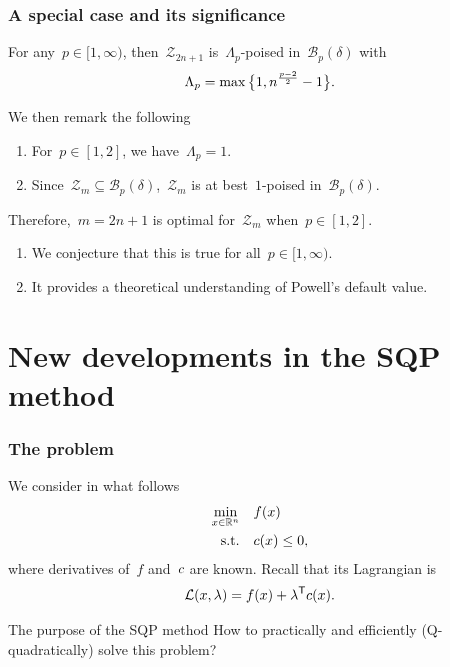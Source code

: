 \documentclass{polyu-presentation}
\newcommand{\con}[1][]{c\ifthenelse{\equal{#1}{}}{}{_{#1}}}
\newcommand{\iter}[1][]{x\ifthenelse{\equal{#1}{}}{}{^{#1}}}
\newcommand{\lag}[1][]{\mathcal{L}\ifthenelse{\equal{#1}{}}{}{^{#1}}}
\newcommand{\lm}[1][]{\lambda\ifthenelse{\equal{#1}{}}{}{^{#1}}}
\newcommand{\obj}{f}
\begin{document}
\begin{frame}
    \frametitle{A special case and its significance}

    \begin{block}{}
        For any~$p \in [1, \infty)$, then~$\mathcal{Z}_{2n + 1}$ is~$\Lambda_p$-poised in~$\mathcal{B}_p(\delta)$ with
        \begin{equation*}
            \Lambda_p = \max \set[\big]{1, n^{\frac{p - 2}{2}} - 1}.
        \end{equation*}
    \end{block}

    \medskip

    We then remark the following
    \begin{enumerate}
        \item For~$p \in [1, 2]$, we have~$\Lambda_p = 1$.
        \item Since~$\mathcal{Z}_m \subseteq \mathcal{B}_p(\delta)$,~$\mathcal{Z}_m$ is \alert{at best}~$1$-poised in~$\mathcal{B}_p(\delta)$.
    \end{enumerate}
    
    \medskip

    \begin{block}{}
        Therefore,~$m = 2n + 1$ is \alert{optimal} for~$\mathcal{Z}_m$ when~$p \in [1, 2]$.
    \end{block}

    \medskip

    \begin{enumerate}
        \item We \alert{conjecture} that this is true for all~$p \in [1, \infty)$.
        \item It provides a theoretical \alert{understanding} of Powell's default value.
    \end{enumerate}
\end{frame}

\section{New developments in the SQP method}

\begin{frame}
    \frametitle{The problem}

	We consider in what follows
    \begin{align*}
        \min_{\iter \in \R^n}   & \quad \obj(\iter)\\
        \text{s.t.}             & \quad \con(\iter) \le 0,
    \end{align*}
    where derivatives of~$\obj$ and~$\con$ are \alert{known}.
    Recall that its \alert{Lagrangian} is
    \begin{equation*}
        \lag(\iter, \lm) = \obj(\iter) + \lm^{\T} \con(\iter).
    \end{equation*}

    \begin{block}{The purpose of the SQP method}
        How to \alert{practically} and \alert{efficiently} (Q-quadratically) solve this problem?
    \end{block}
\end{frame}
\end{document}
